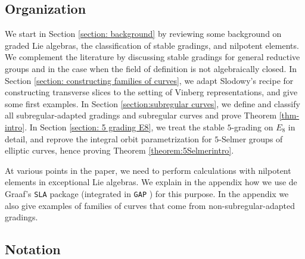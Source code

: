 \documentclass{article} %
\numberwithin{equation}{section}
\theoremstyle{definition}
\begin{document}
\subsection{Organization}
We start in Section \ref{section: background} by reviewing some background on graded Lie algebras, the classification of stable gradings, and nilpotent elements. 
We complement the literature by discussing stable gradings for general reductive groups and in the case when the field of definition is not algebraically closed. 
In Section \ref{section: constructing families of curves}, we adapt Slodowy's recipe for constructing transverse slices to the setting of Vinberg representations, and give some first examples.
In Section \ref{section:subregular curves}, we define and classify all subregular-adapted gradings and subregular curves and prove Theorem \ref{thm-intro}.
In Section \ref{section: 5 grading E8}, we treat the stable $5$-grading on $E_8$ in detail, and reprove the integral orbit parametrization for $5$-Selmer groups of elliptic curves, hence proving Theorem \ref{theorem:5Selmerintro}.


At various points in the paper, we need to perform calculations with nilpotent elements in exceptional Lie algebras. 
We explain in the appendix how we use de Graaf's \texttt{SLA} package \cite{deGraaf-nilporbitsthetagroups} (integrated in \texttt{GAP} \cite{GAP4}) for this purpose. In the appendix we also give examples of families of curves that come from non-subregular-adapted gradings.


\subsection{Notation}\label{subsec: notation}
\end{document}
